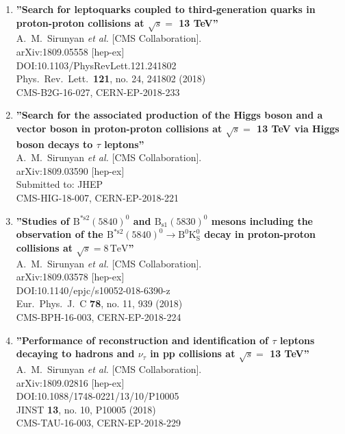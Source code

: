 \begin{enumerate}
\item%
{\bf ''Search for leptoquarks coupled to third-generation quarks in proton-proton collisions at $\sqrt{s}=$ 13 TeV''}
  \\{}A.~M.~Sirunyan {\it et al.} [CMS Collaboration].
  \\{}arXiv:1809.05558 [hep-ex]
  \\{}DOI:10.1103/PhysRevLett.121.241802
  \\{}Phys.\ Rev.\ Lett.\  {\bf 121}, no. 24, 241802 (2018)
  \\{}CMS-B2G-16-027, CERN-EP-2018-233

\item%
{\bf ''Search for the associated production of the Higgs boson and a vector boson in proton-proton collisions at $\sqrt{s}=$ 13 TeV via Higgs boson decays to $\tau$ leptons''}
  \\{}A.~M.~Sirunyan {\it et al.} [CMS Collaboration].
  \\{}arXiv:1809.03590 [hep-ex]
  \\{}Submitted to: JHEP
  \\{}CMS-HIG-18-007, CERN-EP-2018-221

\item%
{\bf ''Studies of ${\mathrm {B}} ^{*{\mathrm {s}}2}(5840)^0 $ and ${\mathrm {B}} _{{\mathrm {s}}1}(5830)^0 $ mesons including the observation of the ${\mathrm {B}} ^{*{\mathrm {s}}2}(5840)^0 \rightarrow {\mathrm {B}} ^0 \mathrm {K} ^0_{\mathrm {S}} $ decay in proton-proton collisions at $\sqrt{s}=8\,\text {TeV} $''}
  \\{}A.~M.~Sirunyan {\it et al.} [CMS Collaboration].
  \\{}arXiv:1809.03578 [hep-ex]
  \\{}DOI:10.1140/epjc/s10052-018-6390-z
  \\{}Eur.\ Phys.\ J.\ C {\bf 78}, no. 11, 939 (2018)
  \\{}CMS-BPH-16-003, CERN-EP-2018-224

\item%
{\bf ''Performance of reconstruction and identification of $\tau$ leptons decaying to hadrons and $\nu_\tau$ in pp collisions at $\sqrt{s}=$ 13 TeV''}
  \\{}A.~M.~Sirunyan {\it et al.} [CMS Collaboration].
  \\{}arXiv:1809.02816 [hep-ex]
  \\{}DOI:10.1088/1748-0221/13/10/P10005
  \\{}JINST {\bf 13}, no. 10, P10005 (2018)
  \\{}CMS-TAU-16-003, CERN-EP-2018-229


\end{enumerate}
